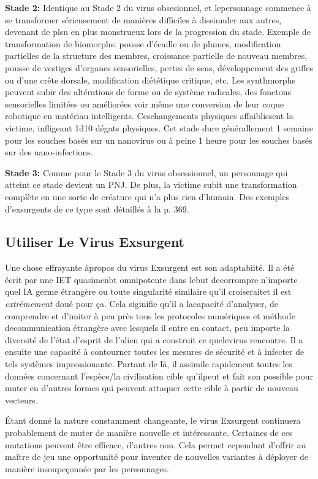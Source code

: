\textbf{Stade 2:} Identique au Stade 2 du virus obsesionnel, et lepersonnage commence à se transformer sérieusement de manières difficiles à dissimuler aux autres, devenant de plsu en plus monstrueux lors de la progression du stade. Exemple de transformation de biomorphs: pousse d'écaille ou de plumes, modification partielles de la structure des membres, croissance partielle de nouveau membres, pousse de vestiges d'organes sensorielles, pertes de sens, développement des griffes ou d'une crête dorsale, modification diététique critique, etc. Les synthmorphs peuvent subir des altérations de forme ou de système radicales, des fonctons sensorielles limitées ou améliorées voir même une conversion de leur coque robotique en matériau intelligents. Ceschangements physiques affaiblissent la victime, infligeant 1d10 dégats physiques. Cet stade dure générallement 1 semaine pour les souches basés sur un nanovirus ou à peine 1 heure pour les souches basés sur des nano-infections. 

\textbf{Stade 3:} Comme pour le Stade 3 du virus obsessionnel, un personnage qui atteint ce stade devient un PNJ. De plus, la victime subit une transformation complète en une sorte de créature qui n'a plus rien d'humain. Des exemples d'exsurgents de ce type sont détaillés à la p. 369. 

\subsection{Utiliser Le Virus Exsurgent} 

Une chose effrayante àpropos du virus Exsurgent est son adaptabiité. Il a été écrit par une IET quasimenbt omnipotente dans lebut decorrompre n'importe quel IA germe étrangère ou toute singularité similaire qu'il croiseraitet il est \textit{extrêmement} doué pour ça. Cela siginifie qu'il a lacapacité d'analyser, de comprendre et d'imiter à peu près tous les protocoles numériques et méthode decommunication étrangère avec lesquels il entre en contact, peu importe la diversité de l'état d'esprit de l'alien qui a construit ce quelevirus rencontre. Il a ensuite une capacité à contourner toutes les mesures de sécurité et à infecter de tels systèmes impressionante. Partant de là, il assimile rapidement toutes les données concernant l'espèce/la civilisation cible qu'ilpeut et fait son possible pour muter en d'autres formes qui peuvent attaquer cette cible à partir de nouveau vecteurs. 

Étant donné la nature constamment changeante, le virus Exsurgent continuera probablement de muter de manière nouvelle et intéressante. Certaines de ces mutations peuvent être efficace, d'autres non. Cela permet cependant d'offrir au maître de jeu une opportunité pour inventer de nouvelles variantes à déployer de manière insoupcçonnée par les personnages. 

